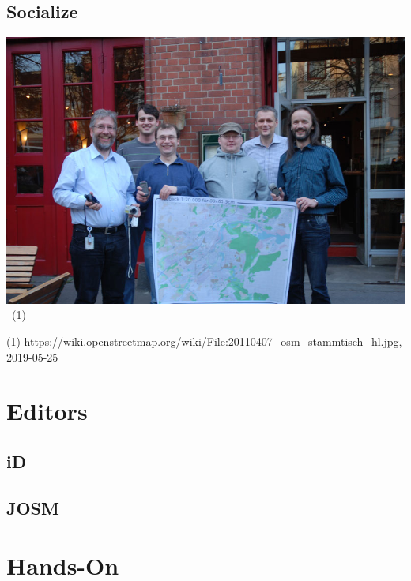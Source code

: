 \documentclass{beamer}
\begin{document}
	\subsection{Socialize}
	
	\begin{frame}
		\begin{center}
			\includegraphics[width=0.8\linewidth,height=0.8\textheight,keepaspectratio]{images/socializing}~\tiny{(1)}
		\end{center}
		{\tiny (1) \url{https://wiki.openstreetmap.org/wiki/File:20110407_osm_stammtisch_hl.jpg}, 2019-05-25}
	\end{frame}
	
	\section{Editors}
	
	\subsection{iD}
	
	\subsection{JOSM}
	
	\section{Hands-On}
\end{document}
